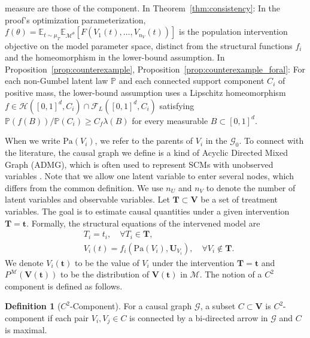\documentclass[12pt]{article}
\theoremstyle{plain}
\theoremstyle{definition}
\newtheorem{definition}[theorem]{Definition}
\theoremstyle{remark}
\begin{document}
measure are those of the component. In Theorem~\ref{thm:consistency}: In the proof's optimization parameterization, $f(\theta)=\mathbb{E}_{t\sim\mu_T}\mathbb{E}_{\mathcal{M}^{\theta}}[F(V_1(t),\ldots,V_{n_V}(t))]$ is the population intervention objective on the model parameter space, distinct from the structural functions $f_i$ and the homeomorphism in the lower-bound assumption. In Proposition~\ref{prop:counterexample}, Proposition~\ref{prop:counterexample_foral}: For each non-Gumbel latent law $\mathbb P$ and each connected support component $C_i$ of positive mass, the lower-bound assumption uses a Lipschitz homeomorphism $f\in\mathcal H([0,1]^d,C_i)\cap\mathcal F_L([0,1]^d,C_i)$ satisfying $\mathbb P(f(B))/\mathbb P(C_i)\geqslant C_f\lambda(B)$ for every measurable $B\subset[0,1]^d$.

When we write $ \text{Pa}(V_i) $, we refer to the parents of $V_i$ in the $\mathcal{G}_0$. To connect with the literature, the causal graph we define is a kind of Acyclic Directed Mixed Graph (ADMG), which is often used to represent SCMs with unobserved variables \cite{tianTestableImplicationsCausal2002}. Note that we allow one latent variable to enter several nodes, which differs from the common definition. We use $ n_U $ and $n_V$ to denote the number of latent variables and observable variables. Let $ \boldsymbol{T}\subset \boldsymbol{V}$ be a set of treatment variables. The goal is to estimate causal quantities under a given intervention $ \boldsymbol{T}=\boldsymbol{t}$. Formally, the structural equations of the intervened model are
\begin{align*}
    & T_i = t_i, \quad \forall T_i\in\boldsymbol{T}, \\
    & V_{i}(t) =f_{i}\left(\text{Pa}( V_{i}) ,\boldsymbol{U}_{V_{i}}\right), \quad \forall V_i \notin \boldsymbol{T}.
\end{align*}
We denote $V_i(\boldsymbol{t})$ to be the value of $V_i$ under the intervention $\boldsymbol{T}=\boldsymbol{t}$ and $P^\mathcal{M}(\boldsymbol{V}(\boldsymbol{t}))$ to be the distribution of $\boldsymbol{V}(\boldsymbol{t})$ in $\mathcal{M}$. The notion of a $C^2$ component \cite{xiaCausalNeuralConnectionExpressiveness2022} is defined as follows.
\begin{definition}[$ C^2$-Component]
    For a causal graph $ \mathcal{G}$, a subset $ C\subset \boldsymbol{V}$ is $ C^{2}$-component if each pair $ V_{i} ,V_{j} \in C$ is connected by a bi-directed arrow in $\mathcal{G}$ and $ C$ is maximal.
    \end{definition}
\end{document}

